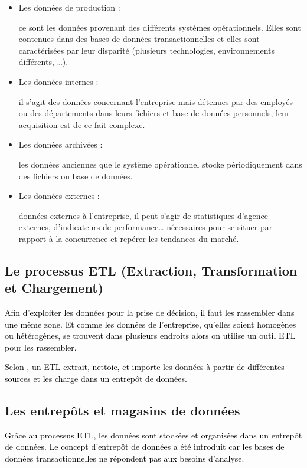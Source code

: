 \documentclass[a4paper,12pt]{report}
\begin{document}
\begin{itemize}
	\item  \begin{bf}Les données de production : \end{bf}ce sont les données provenant des différents systèmes opérationnels. Elles sont contenues dans des bases de  données transactionnelles et elles sont caractérisées par leur disparité (plusieurs technologies, environnements différents, …).
	\item  \begin{bf}Les données internes :  \end{bf}il s’agit des données concernant l’entreprise mais détenues par des employés ou des départements dans leurs  fichiers et base de données personnels, leur acquisition est de ce fait complexe. 
	\item  \begin{bf}Les données archivées : \end{bf}les données anciennes que le système opérationnel stocke périodiquement dans des fichiers ou base de données.  
	\item  \begin{bf}Les données externes : \end{bf} données externes à l’entreprise, il peut s’agir de statistiques d’agence externes, d’indicateurs de performance… nécessaires pour se situer par rapport à la concurrence et repérer les tendances du marché.
\end{itemize}
\subsection{Le processus ETL (Extraction, Transformation et Chargement)}
\textcolor{black}{Afin d’exploiter les données pour la prise de décision, il faut les rassembler dans une même zone. Et comme les données de l’entreprise, qu’elles soient homogènes ou hétérogènes, se trouvent dans plusieurs endroits alors on utilise un outil ETL pour les rassembler.}

\textcolor{black}{Selon \citep{polet12infor}, un ETL extrait, nettoie, et importe les données à partir de  différentes sources et les charge dans un entrepôt de données.}

\subsection{Les entrepôts et magasins de données}
\textcolor{black}{Grâce au processus ETL, les données sont stockées et organisées dans un entrepôt de données. Le concept d’entrepôt de données a été introduit car les bases de données transactionnelles ne  répondent pas aux besoins d’analyse.}
\end{document}

